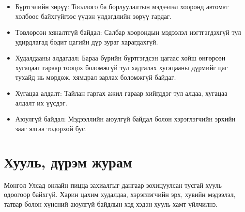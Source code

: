 \begin{itemize}
    \item Бүртгэлийн зөрүү: Тооллого ба борлуулалтын мэдээлэл хооронд автомат холбоос байхгүйгээс үүдэн үлдэгдлийн зөрүү гардаг.
    \item Төвлөрсөн хяналтгүй байдал: Салбар хоорондын мэдээлэл нэгтгэгдэхгүй тул удирдлагад бодит цагийн дүр зураг харагдахгүй.
    \item Худалдааны алдагдал: Бараа бүрийн бүртгэгдсэн цагаас хойш өнгөрсөн хугацааг гараар тооцох боломжгүй тул хадгалах хугацааны дүрмийг цаг тухайд нь мөрдөж, хямдрал зарлах боломжгүй байдаг.
    \item Хугацаа алдалт: Тайлан гаргах ажил гараар хийгддэг тул алдаа, хугацаа алдалт их үүсдэг.
    \item Аюулгүй байдал: Мэдээллийн аюулгүй байдал болон хэрэглэгчийн эрхийн зааг ялгаа тодорхой бус.
\end{itemize}

\section{Хууль, дүрэм журам}
Монгол Улсад онлайн пицца захиалгыг дангаар зохицуулсан тусгай хууль одоогоор байхгүй. Харин цахим худалдаа, хэрэглэгчийн эрх, хувийн мэдээлэл, татвар болон хүнсний аюулгүй байдлын хэд хэдэн хууль хамт үйлчилнэ.


